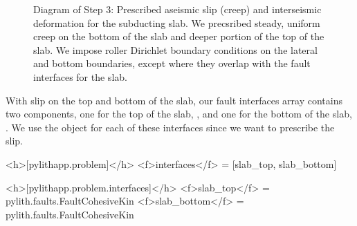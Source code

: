 \begin{figure}[htbp]
  \caption{Diagram of Step 3: Prescribed aseismic slip (creep) and
    interseismic deformation for the subducting slab. We precsribed
    steady, uniform creep on the
    bottom of the slab and deeper portion of the top of the slab. We
    impose roller Dirichlet boundary conditions on the lateral and
    bottom boundaries, except where they overlap with the fault
    interfaces for the slab.}
  \label{fig:example:subduction:3d:step03:diagram}
\end{figure}

With slip on the top and bottom of the slab, our fault interfaces
array contains two components, one for the top of the slab,
, and one for the bottom of the slab,
. We use the 
object for each of these interfaces since we want to prescribe the
slip.
\begin{cfg}
<h>[pylithapp.problem]</h>
<f>interfaces</f> = [slab_top, slab_bottom]

<h>[pylithapp.problem.interfaces]</h>
<f>slab_top</f> = pylith.faults.FaultCohesiveKin
<f>slab_bottom</f> = pylith.faults.FaultCohesiveKin
\end{cfg}

